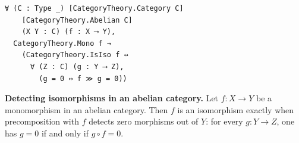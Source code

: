 \begin{list}{}
\item
\begin{samepage}
\begin{lstlisting}[basicstyle=\ttfamily\footnotesize,frame=single,breaklines=true]
∀ (C : Type _) [CategoryTheory.Category C]
    [CategoryTheory.Abelian C]
    (X Y : C) (f : X ⟶ Y),
  CategoryTheory.Mono f →
    (CategoryTheory.IsIso f ↔
      ∀ (Z : C) (g : Y ⟶ Z),
        (g = 0 ↔ f ≫ g = 0))
\end{lstlisting}
\noindent\textbf{Detecting isomorphisms in an abelian category.}
Let $f:X\to Y$ be a monomorphism in an abelian category. Then $f$ is an
isomorphism exactly when precomposition with $f$ detects zero morphisms out of
$Y$: for every $g:Y\to Z$, one has $g=0$ if and only if $g\circ f=0$.
\end{samepage}

\end{list}
